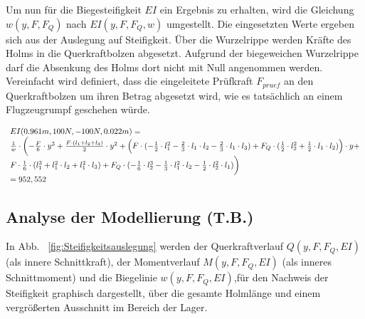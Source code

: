 \noindent Um nun für die Biegesteifigkeit $EI$ ein Ergebnis zu erhalten, wird die Gleichung $w(y,F,F_{Q})$ nach $EI(y,F,F_{Q},w)$ umgestellt. Die eingesetzten Werte ergeben sich aus der Auslegung auf Steifigkeit. Über die Wurzelrippe werden Kräfte des Holms in die Querkraftbolzen abgesetzt. Aufgrund der biegeweichen Wurzelrippe darf die Absenkung des Holms dort nicht mit Null angenommen werden. Vereinfacht wird definiert, dass die eingeleitete Prüfkraft $F_{pruef}$ an den Querkraftbolzen um ihren Betrag abgesetzt wird, wie es tatsächlich an einem Flugzeugrumpf geschehen würde. 

\begin{equation}
	\begin{array}{l}
		EI(0.961m, 100N, -100N, 0.022m)= \\
		\frac{1}{w}\cdot\biggl(-\frac{F}{6}\cdot y^{3} + \frac{ F\cdot (l_{1}+l_{2}+l_{3})}{2}\cdot y^{2} + \Bigl(F\cdot(-\frac{1}{2}\cdot l_{1}^{2} -\frac{2}{3}\cdot l_{1}\cdot l_{2}-\frac{2}{3}\cdot l_{1}\cdot l_{3}) +		F_{Q}\cdot(\frac{1}{2}\cdot l_{2}^{2}+\frac{1}{2}\cdot l_{1}\cdot l_{2})\Bigr)\cdot y +\\
		F\cdot\frac{1}{6}\cdot(l_{1}^{3}+l_{1}^{2}\cdot l_{2}+l_{1}^{2}\cdot l_{3}) + F_{Q}\cdot(-\frac{1}{6}\cdot l_{2}^{3}-\frac{1}{3}\cdot l_{1}^{2}\cdot l_{2}-\frac{1}{2}\cdot l_{2}^{2}\cdot l_{1})\biggr)\\
		=952,552
	\end{array}
\end{equation}

\subsection{Analyse der Modellierung (T.B.)}
In Abb. ~\ref{fig:Steifigkeitsauslegung} werden der Querkraftverlauf $Q(y,F,F_{Q},EI)$ (als innere Schnittkraft), der Momentverlauf $M(y,F,F_{Q},EI)$ (als inneres Schnittmoment) und die Biegelinie $	w(y,F,F_{Q},EI)$,für den Nachweis der Steifigkeit graphisch dargestellt, über die gesamte Holmlänge und einem vergrößerten Ausschnitt im Bereich der Lager. \\

